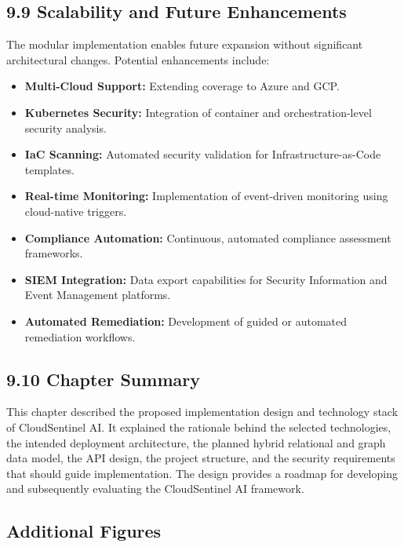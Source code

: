 \subsection{9.9 Scalability and Future Enhancements}

The modular implementation enables future expansion without significant architectural changes. Potential enhancements include:

\begin{itemize}
\tightlist
\item
  \textbf{Multi-Cloud Support:} Extending coverage to Azure and GCP.\\
\item
  \textbf{Kubernetes Security:} Integration of container and orchestration-level security analysis.\\
\item
  \textbf{IaC Scanning:} Automated security validation for Infrastructure-as-Code templates.\\
\item
  \textbf{Real-time Monitoring:} Implementation of event-driven monitoring using cloud-native triggers.\\
\item
  \textbf{Compliance Automation:} Continuous, automated compliance assessment frameworks.\\
\item
  \textbf{SIEM Integration:} Data export capabilities for Security Information and Event Management platforms.\\
\item
  \textbf{Automated Remediation:} Development of guided or automated remediation workflows.
\end{itemize}

\subsection{9.10 Chapter Summary}

This chapter described the proposed implementation design and technology stack of CloudSentinel AI. It explained the rationale behind the selected technologies, the intended deployment architecture, the planned hybrid relational and graph data model, the API design, the project structure, and the security requirements that should guide implementation. The design provides a roadmap for developing and subsequently evaluating the CloudSentinel AI framework.

\subsection{Additional Figures}

